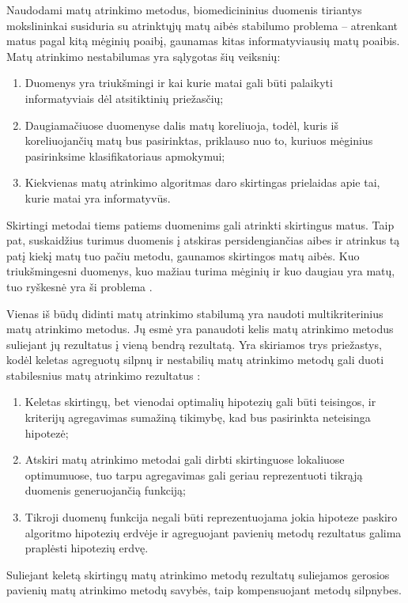 Naudodami matų atrinkimo metodus, biomedicininius duomenis tiriantys mokslininkai susiduria su atrinktųjų matų aibės stabilumo problema -- atrenkant matus pagal kitą mėginių poaibį, gaunamas kitas informatyviausių matų poaibis. Matų atrinkimo nestabilumas yra sąlygotas šių veiksnių:
\begin{enumerate}
 \item Duomenys yra triukšmingi ir kai kurie matai gali būti palaikyti informatyviais dėl atsitiktinių priežasčių;
 \item Daugiamačiuose duomenyse dalis matų koreliuoja, todėl, kuris iš koreliuojančių matų bus pasirinktas, priklauso nuo to, kuriuos mėginius pasirinksime klasifikatoriaus apmokymui;
 \item Kiekvienas matų atrinkimo algoritmas daro skirtingas prielaidas apie tai, kurie matai yra informatyvūs.
\end{enumerate}
Skirtingi metodai tiems patiems duomenims gali atrinkti skirtingus matus. Taip pat, suskaidžius turimus duomenis į atskiras persidengiančias aibes ir atrinkus tą patį kiekį matų tuo pačiu metodu, gaunamos skirtingos matų aibės. Kuo triukšmingesni duomenys, kuo mažiau turima mėginių ir kuo daugiau yra matų, tuo ryškesnė yra ši problema \cite{loscalzo2009consensus}. 

Vienas iš būdų didinti matų atrinkimo stabilumą yra naudoti multikriterinius matų atrinkimo metodus. Jų esmė yra panaudoti kelis matų atrinkimo metodus suliejant jų rezultatus į vieną bendrą rezultatą. Yra skiriamos trys priežastys, kodėl keletas agreguotų silpnų ir nestabilių matų atrinkimo metodų gali duoti stabilesnius matų atrinkimo rezultatus \cite{dietterich2000ensemble}:
\begin{enumerate}
 \item Keletas skirtingų, bet vienodai optimalių hipotezių gali būti teisingos, ir kriterijų agregavimas sumažiną tikimybę, kad bus pasirinkta neteisinga hipotezė;
 \item Atskiri matų atrinkimo metodai gali dirbti skirtinguose lokaliuose optimumuose, tuo tarpu agregavimas gali geriau reprezentuoti tikrąją  duomenis generuojančią funkciją;
 \item Tikroji duomenų funkcija negali būti reprezentuojama jokia hipoteze paskiro algoritmo hipotezių erdvėje ir agreguojant pavienių metodų rezultatus galima praplėsti hipotezių erdvę.
\end{enumerate}
Suliejant keletą skirtingų matų atrinkimo metodų rezultatų suliejamos gerosios pavienių matų atrinkimo metodų savybės, taip kompensuojant metodų silpnybes.

